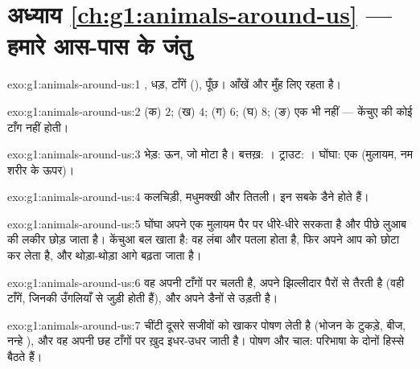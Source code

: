 \section*{अध्याय \ref{ch:g1:animals-around-us} --- हमारे आस-पास के जंतु}

\begin{solution}{exo:g1:animals-around-us:1}
, धड़, टाँगें (), पूँछ।  आँखें और मुँह लिए रहता है।
\end{solution}

\begin{solution}{exo:g1:animals-around-us:2}
(क) $2$; (ख) $4$; (ग) $6$; (घ) $8$; (ङ) एक भी नहीं --- केंचुए की कोई
टाँग नहीं होती।
\end{solution}

\begin{solution}{exo:g1:animals-around-us:3}
भेड़: ऊन, जो मोटा  है। बत्तख़: । ट्राउट: । घोंघा: एक 
(मुलायम, नम शरीर के ऊपर)।
\end{solution}

\begin{solution}{exo:g1:animals-around-us:4}
कलचिड़ी, मधुमक्खी और तितली। इन सबके डैने होते हैं।
\end{solution}

\begin{solution}{exo:g1:animals-around-us:5}
घोंघा अपने एक मुलायम पैर पर धीरे-धीरे सरकता है और पीछे लुआब की लकीर
छोड़ जाता है। केंचुआ बल खाता है: वह लंबा और पतला होता है, फिर अपने आप
को छोटा कर लेता है, और थोड़ा-थोड़ा आगे बढ़ता जाता है।
\end{solution}

\begin{solution}{exo:g1:animals-around-us:6}
वह अपनी टाँगों पर चलती है, अपने झिल्लीदार पैरों से तैरती है (वही
टाँगें, जिनकी उँगलियाँ  से जुड़ी होती हैं), और अपने डैनों से
उड़ती है।
\end{solution}

\begin{solution}{exo:g1:animals-around-us:7}
चींटी दूसरे सजीवों को खाकर पोषण लेती है (भोजन के टुकड़े, बीज, नन्हे
), और वह अपनी छह टाँगों पर ख़ुद इधर-उधर जाती है। पोषण और चाल:
परिभाषा के दोनों हिस्से बैठते हैं।
\end{solution}

